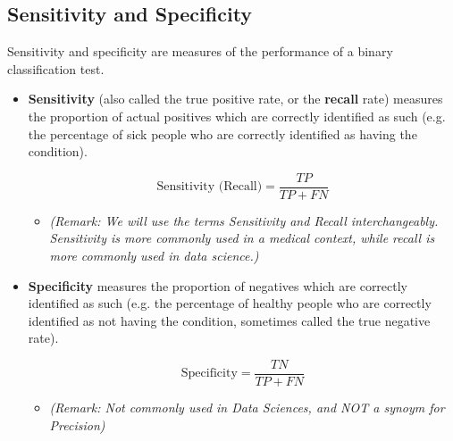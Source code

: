 \documentclass[a4paper,12pt]{article}
\begin{document}
\newpage
\subsection*{Sensitivity and Specificity}
Sensitivity and specificity are measures of the performance of a binary classification
test.
\begin{itemize}
	\item \textbf{Sensitivity} (also called the true positive rate, or the \textbf{recall} rate) measures
	the proportion of actual positives which are correctly identified
	as such (e.g. the percentage of sick people who are correctly identified
	as having the condition).
	
	\[ \mbox{Sensitivity (Recall)} = \frac{TP}{TP +FN}\]
	
	\begin{itemize}
		\item \textit{(Remark: We will use the terms Sensitivity and Recall interchangeably.
			Sensitivity is more commonly used in a medical context, while recall is more
			commonly used in data science.)}
	\end{itemize}
	\item \textbf{Specificity} measures the proportion of negatives which are correctly
	identified as such (e.g. the percentage of healthy people who are correctly
	identified as not having the condition, sometimes called the true
	negative rate).
	
	\[ \mbox{Specificity} = \frac{TN}{TP +FN}\]
	
	\begin{itemize}
		\item \textit{(Remark: Not commonly used in Data Sciences, and NOT a synoym for Precision)}
	\end{itemize}
\end{itemize}
\newpage
\end{document}

